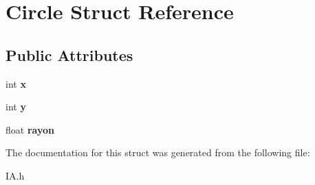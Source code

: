 \hypertarget{structCircle}{}\section{Circle Struct Reference}
\label{structCircle}
\subsection*{Public Attributes}
\begin{DoxyCompactItemize}
\item 
\mbox{\label{structCircle_abceecd15b990054ddc30441cfcbb205d}} 
int {\bfseries x}
\item 
\mbox{\label{structCircle_a78aef28b3c176d14e8d25f8cd84e7dfd}} 
int {\bfseries y}
\item 
\mbox{\label{structCircle_a071d166f8d58ab6f055cdbbf494b33ce}} 
float {\bfseries rayon}
\end{DoxyCompactItemize}


The documentation for this struct was generated from the following file\+:\begin{DoxyCompactItemize}
\item 
I\+A.\+h\end{DoxyCompactItemize}
